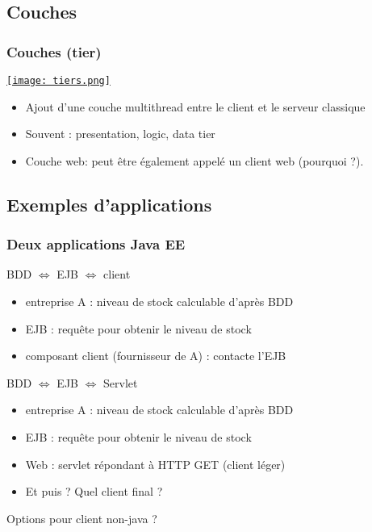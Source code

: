 \documentclass[english, french]{beamer}
\begin{document}
\subsection{Couches}
\begin{frame}
	\frametitle{Couches (\og{}tier\fg{})}
	\begin{minipage}{\columnwidth*\real{0.6}}
		\href{https://docs.oracle.com/javaee/7/tutorial/overview003.htm}{\texttt{[image: tiers.png]}}
	\end{minipage}%
	\begin{minipage}{\columnwidth*\real{0.4}}
		\begin{itemize}
			\item Ajout d’une couche multithread entre le client et le serveur classique
			\item Souvent : presentation, logic, data tier
			\item Couche web: peut être également appelé un client web (pourquoi ?).
		\end{itemize}
	\end{minipage}
\end{frame}

\subsection{Exemples d’applications}
\begin{frame}
	\frametitle{Deux applications Java EE}
	\begin{block}{BDD $⇔$ EJB $⇔$ client}
		\begin{itemize}
			\item entreprise A : niveau de stock calculable d’après BDD
			\item EJB : requête pour obtenir le niveau de stock
			\item composant client (fournisseur de A) : contacte l’EJB
		\end{itemize}		
	\end{block}
	
	\begin{block}{BDD $⇔$ EJB $⇔$ Servlet}
		\begin{itemize}
			\item entreprise A : niveau de stock calculable d’après BDD
			\item EJB : requête pour obtenir le niveau de stock
			\item Web : servlet répondant à HTTP GET (client léger)
			\item Et puis ? Quel client final ?
		\end{itemize}		
	\end{block}
	
	Options pour client non-java ?
\end{frame}
\end{document}
